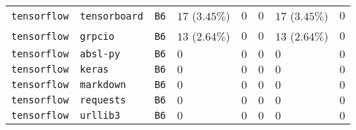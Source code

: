 \begin{table}
\begin{tabular}{llllllll}
\texttt{tensorflow} & \texttt{tensorboard} & \texttt{B6} & $17$ ($3.45\%$) & $0$ & $0$ & $17$ ($3.45\%$) & $0$ \\
\texttt{tensorflow} & \texttt{grpcio} & \texttt{B6} & $13$ ($2.64\%$) & $0$ & $0$ & $13$ ($2.64\%$) & $0$ \\
\texttt{tensorflow} & \texttt{absl-py} & \texttt{B6} & $0$ & $0$ & $0$ & $0$ & $0$ \\
\texttt{tensorflow} & \texttt{keras} & \texttt{B6} & $0$ & $0$ & $0$ & $0$ & $0$ \\
\texttt{tensorflow} & \texttt{markdown} & \texttt{B6} & $0$ & $0$ & $0$ & $0$ & $0$ \\
\texttt{tensorflow} & \texttt{requests} & \texttt{B6} & $0$ & $0$ & $0$ & $0$ & $0$ \\
\texttt{tensorflow} & \texttt{urllib3} & \texttt{B6} & $0$ & $0$ & $0$ & $0$ & $0$ \\
\bottomrule
\end{tabular}
\end{table}
